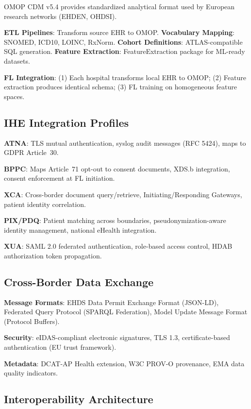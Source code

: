\documentclass[conference,a4paper]{IEEEtran}
\begin{document}
OMOP CDM v5.4 provides standardized analytical format used by European research networks (EHDEN, OHDSI).

\textbf{ETL Pipelines}: Transform source EHR to OMOP. \textbf{Vocabulary Mapping}: SNOMED, ICD10, LOINC, RxNorm. \textbf{Cohort Definitions}: ATLAS-compatible SQL generation. \textbf{Feature Extraction}: FeatureExtraction package for ML-ready datasets.

\textbf{FL Integration}: (1) Each hospital transforms local EHR to OMOP; (2) Feature extraction produces identical schema; (3) FL training on homogeneous feature spaces.

\subsection{IHE Integration Profiles}

\textbf{ATNA}: TLS mutual authentication, syslog audit messages (RFC 5424), maps to GDPR Article~30.

\textbf{BPPC}: Maps Article~71 opt-out to consent documents, XDS.b integration, consent enforcement at FL initiation.

\textbf{XCA}: Cross-border document query/retrieve, Initiating/Responding Gateways, patient identity correlation.

\textbf{PIX/PDQ}: Patient matching across boundaries, pseudonymization-aware identity management, national eHealth integration.

\textbf{XUA}: SAML 2.0 federated authentication, role-based access control, HDAB authorization token propagation.

\subsection{Cross-Border Data Exchange}

\textbf{Message Formats}: EHDS Data Permit Exchange Format (JSON-LD), Federated Query Protocol (SPARQL Federation), Model Update Message Format (Protocol Buffers).

\textbf{Security}: eIDAS-compliant electronic signatures, TLS 1.3, certificate-based authentication (EU trust framework).

\textbf{Metadata}: DCAT-AP Health extension, W3C PROV-O provenance, EMA data quality indicators.

\subsection{Interoperability Architecture}
\end{document}
